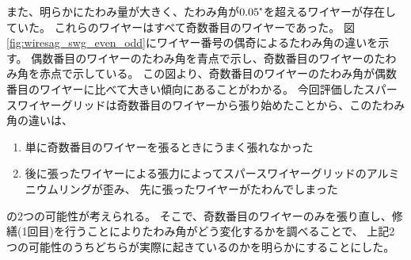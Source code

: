 \documentclass[../../main.tex]{subfiles}
\begin{document}
また、明らかにたわみ量が大きく、たわみ角が$0.05\tcdegree$を超えるワイヤーが存在していた。
これらのワイヤーはすべて奇数番目のワイヤーであった。
図\ref{fig:wiresag_swg_even_odd}にワイヤー番号の偶奇によるたわみ角の違いを示す。
偶数番目のワイヤーのたわみ角を青点で示し、奇数番目のワイヤーのたわみ角を赤点で示している。
この図より、奇数番目のワイヤーのたわみ角が偶数番目のワイヤーに比べて大きい傾向にあることがわかる。
今回評価したスパースワイヤーグリッドは奇数番目のワイヤーから張り始めたことから、このたわみ角の違いは、
\begin{enumerate}
    \item 単に奇数番目のワイヤーを張るときにうまく張れなかった
    \item 後に張ったワイヤーによる張力によってスパースワイヤーグリッドのアルミニウムリングが歪み、
          先に張ったワイヤーがたわんでしまった
\end{enumerate}
の2つの可能性が考えられる。
そこで、奇数番目のワイヤーのみを張り直し、修繕(1回目)を行うことによりたわみ角がどう変化するかを調べることで、
上記2つの可能性のうちどちらが実際に起きているのかを明らかにすることにした。
\end{document}
